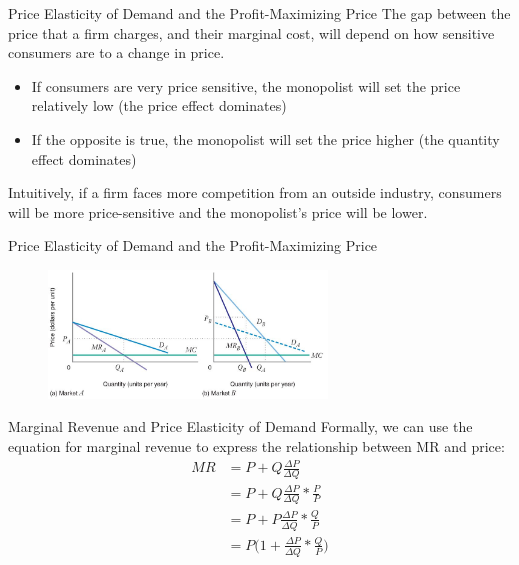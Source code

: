 \documentclass[11pt,t]{beamer}
\begin{document}
\begin{frame}{Price Elasticity of Demand and the Profit-Maximizing Price}
  The gap between the price that a firm charges, and their marginal cost, will depend on how sensitive consumers are to a change in price.

  \begin{itemize}
    \item If consumers are very price sensitive, the monopolist will set the price relatively low (the price effect dominates)

    \item If the opposite is true, the monopolist will set the price higher (the quantity effect dominates)
  \end{itemize}

  \bigskip\pause
  Intuitively, if a firm faces more competition from an outside industry, consumers will be more price-sensitive and the monopolist's price will be lower.
\end{frame}

\begin{frame}{Price Elasticity of Demand and the Profit-Maximizing Price}
  \begin{figure}
    \includegraphics[width=280px]{figures/fig11_7.jpg}
  \end{figure}
\end{frame}

\begin{frame}{Marginal Revenue and Price Elasticity of Demand}
  Formally, we can use the equation for marginal revenue to express the relationship between MR and price:
  \begin{align*}
    MR &= P + Q \frac{\Delta P}{\Delta Q}                         \\
       &= P + Q \frac{\Delta P}{\Delta Q} * \frac{P}{P}           \\
       &= P + P \frac{\Delta P}{\Delta Q} * \frac{Q}{P}           \\
       &= P \Big(1 + \frac{\Delta P}{\Delta Q} * \frac{Q}{P} \Big)
  \end{align*}
\end{frame}
\end{document}
